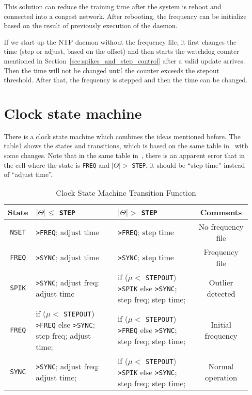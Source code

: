 This solution can reduce the training time after the system is reboot and
connected into a congest network. After rebooting, the frequency can be
initialize based on the result of previously execution of the daemon.  

If we start up the NTP daemon without the frequency file, it first changes the
time (step or adjust, based on the offset) and then starts the watchdog counter
mentioned in Section~\ref{sec:spikes_and_step_control} after a valid update
arrives. Then the time will not be changed until the counter exceeds the
stepout threshold.  After that, the frequency is stepped and then the time can
be changed.

\section{Clock state machine}%
\label{sec:clock_state_machine}
There is a clock state machine which combines the ideas mentioned before. 
The table\ref{tab:clock_state_machien_transition_function} shows the states
and transitions, which is based on the same table in~\cite{redbook} with some
changes. Note that in the same table in~\cite{rfc5905}, there is an apparent
error that in the cell where the state is \verb|FREQ| and $|\Theta| >$
\verb|STEP|, it should be ``step time'' instead of ``adjust time''.

\begin{table}[ht]
    \centering
    \caption{Clock State Machine Transition Function}
    \label{tab:clock_state_machien_transition_function}
    \begin{tabular}{|c|p{43mm}|p{43mm}|c|}
        \hline
        State &\hfil $|\Theta|\le$ \verb|STEP| & \hfil $|\Theta|>$ \verb|STEP| 
        & Comments \\
        \hline
        \verb|NSET| & \verb|>FREQ|; adjust time & \verb|>FREQ|; step time 
            & No frequency file \\
        \hline
        \verb|FREQ| & \verb|>SYNC|; adjust time & \verb|>SYNC|; step time
            & Frequency file \\
        \hline
        \verb|SPIK| & \verb|>SYNC|; adjust freq; adjust time 
        & if ($\mu <$ \verb|STEPOUT|) \verb|>SPIK| \newline 
        else \verb|>SYNC|; step freq; step time;
        & Outlier detected \\
        \hline
        \verb|FREQ| & if ($\mu <$ \verb|STEPOUT|) \verb|>FREQ| \newline 
        else \verb|>SYNC|; step freq; adjust time;
        & if ($\mu <$ \verb|STEPOUT|) \verb|>FREQ| \newline 
        else \verb|>SYNC|; step freq; step time;
        & Initial frequency \\
        \hline
        \verb|SYNC| & \verb|>SYNC|; adjust freq; adjust time;
        & if ($\mu <$ \verb|STEPOUT|) \verb|>SPIK| \newline 
        else \verb|>SYNC|; step freq; step time; & Normal operation \\
        \hline
    \end{tabular}
\end{table}

